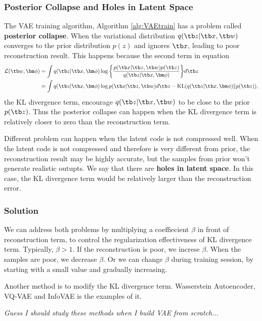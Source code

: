 \documentclass{article}
\begin{document}
        \subsubsection{Posterior Collapse and Holes in Latent Space}
            The VAE training algorithm, Algorithm \ref{alg:VAEtrain} has a problem called \textbf{posterior collapse}.
            When the variational distribution $q(\tb z|\tb x, \tb w)$ converges to the prior distribution $p(z)$ and ignores $\tb x$, leading to poor reconstruction result.
            This happens because the second term in equation
            \begin{align*}
                \mathcal{L}(\tb w,\bm\phi)&=\int q(\tb z|\tb x, \bm\phi)\log{\left\{ \frac{p(\tb x|\tb z, \tb w)p(\tb z)}{q(\tb z|\tb x, \bm\phi)} \right\}}d\tb z
                \\ &=\int q(\tb z|\tb x,\bm\phi)\log{p(\tb x|\tb z,\tb w)}d\tb z - \text{KL}(q(\tb z|\tb x,\bm\phi)\|p(\tb z)),
            \end{align*}
            the KL divergence term, encourage $q(\tb z|\tb x, \tb w)$ to be close to the prior $p(\tb z)$. Thus the posterior collapse can happen when the KL divergence term is relatively closer to zero 
            than the reconstruction term.
            
            Different problem can happen when the latent code is not compressed well. When the latent code is not compressed and therefore is very different from prior,
            the reconstruction result may be highly accurate, but the samples from prior won't generate realistic outupts. We say that there are \textbf{holes in latent space}.
            In this case, the KL divergence term would be relatively larger than the reconstruction error.
        
        \subsubsection{Solution}
            We can address both problems by multiplying a coeffiecient $\beta$ in front of reconstruction term, to control the regularization effectiveness of KL divergence term.
            Typically, $\beta > 1$. If the reconstruction is poor, we increse $\beta$. When the samples are poor, we decrease $\beta$. 
            Or we can change $\beta$ during training session, by starting with a small value and gradually increasing.

            Another method is to modify the KL divergence term. Wasserstein Autoencoder, VQ-VAE and InfoVAE is the examples of it.
            
            \emph{Guess I should study these methods when I build VAE from scratch...}
\end{document}
